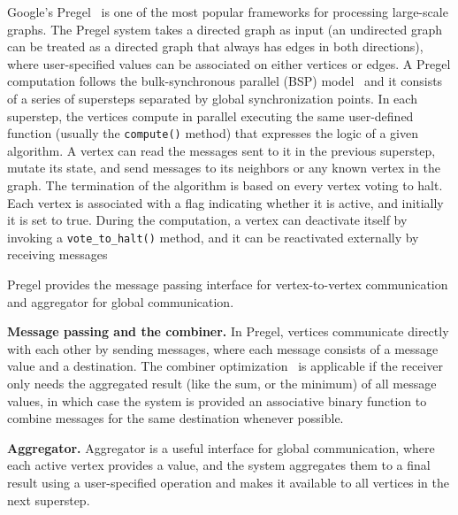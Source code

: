 \documentclass{sokendai_thesis} %
\begin{document}

Google's Pregel~\cite{pregel} is one of the most popular frameworks for processing large-scale graphs.
The Pregel system takes a directed graph as input (an undirected graph can be treated as a directed graph that always has edges in both directions), where user-specified values can be associated on either vertices or edges.
A Pregel computation follows the bulk-synchronous parallel (BSP) model~\cite{bsp} and it consists of a series of supersteps separated by global synchronization points.
In each superstep, the vertices compute in parallel executing the same user-defined function (usually the \texttt{compute()} method) that expresses the logic of a given algorithm.
A vertex can read the messages sent to it in the previous superstep, mutate its state, and send messages to its neighbors or any known vertex in the graph.
The termination of the algorithm is based on every vertex voting to halt.
Each vertex is associated with a flag indicating whether it is active, and initially it is set to true.
During the computation, a vertex can deactivate itself by invoking a \texttt{vote\_to\_halt()} method, and it can be reactivated externally by receiving messages


Pregel provides the message passing interface for vertex-to-vertex communication and aggregator for global communication.

\textbf{Message passing and the combiner.}
In Pregel, vertices communicate directly with each other by sending messages, where each message consists of a message value and a destination.
The combiner optimization~\cite{pregel} is applicable if the receiver only needs the aggregated result (like the sum, or the minimum) of all message values,
in which case the system is provided an associative binary function to combine messages for the same destination whenever possible.

\textbf{Aggregator.}
Aggregator is a useful interface for global communication, where each active vertex provides a value, and the system aggregates them to a final result using a user-specified operation and makes it available to all vertices in the next superstep.
\end{document}
